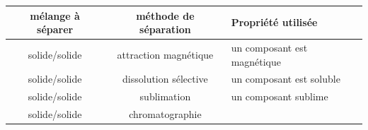 \documentclass[
  11pt,
  french,
  a4paper,
  openany]{book}
\begin{document}
\begin{longtable}[]{@{}ccl@{}}
\toprule
\begin{minipage}[b]{0.19\columnwidth}\centering
mélange à séparer\strut
\end{minipage} & \begin{minipage}[b]{0.28\columnwidth}\centering
méthode de séparation\strut
\end{minipage} & \begin{minipage}[b]{0.44\columnwidth}\raggedright
Propriété utilisée\strut
\end{minipage}\tabularnewline
\midrule
\endhead
\begin{minipage}[t]{0.19\columnwidth}\centering
solide/solide\strut
\end{minipage} & \begin{minipage}[t]{0.28\columnwidth}\centering
attraction magnétique\strut
\end{minipage} & \begin{minipage}[t]{0.44\columnwidth}\raggedright
un composant est magnétique\strut
\end{minipage}\tabularnewline
\begin{minipage}[t]{0.19\columnwidth}\centering
solide/solide\strut
\end{minipage} & \begin{minipage}[t]{0.28\columnwidth}\centering
dissolution sélective\strut
\end{minipage} & \begin{minipage}[t]{0.44\columnwidth}\raggedright
un composant est soluble\strut
\end{minipage}\tabularnewline
\begin{minipage}[t]{0.19\columnwidth}\centering
solide/solide\strut
\end{minipage} & \begin{minipage}[t]{0.28\columnwidth}\centering
sublimation\strut
\end{minipage} & \begin{minipage}[t]{0.44\columnwidth}\raggedright
un composant sublime\strut
\end{minipage}\tabularnewline
\begin{minipage}[t]{0.19\columnwidth}\centering
solide/solide\strut
\end{minipage} & \begin{minipage}[t]{0.28\columnwidth}\centering
chromatographie\strut
\end{minipage} & \begin{minipage}[t]{0.44\columnwidth}\raggedright

\end{minipage}
\end{longtable}
\end{document}
